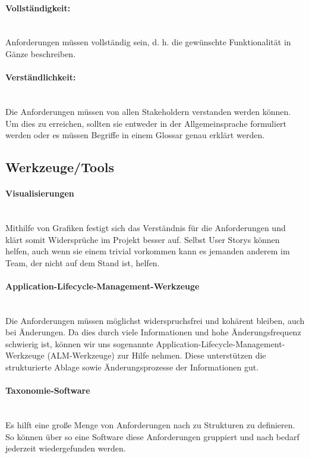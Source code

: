 \documentclass[a4paper, ngerman, 12pt, usenames, dvipsnames]{article}
\begin{document}
\paragraph{Vollständigkeit:}\mbox{} \\
Anforderungen müssen vollständig sein, d. h. die gewünschte Funktionalität in Gänze beschreiben.
\paragraph{Verständlichkeit:}\mbox{} \\
Die Anforderungen müssen von allen Stakeholdern verstanden werden können. 
Um dies zu erreichen, sollten sie entweder in der Allgemeinsprache formuliert werden oder es müssen Begriffe in einem Glossar genau erklärt werden.


\subsection{Werkzeuge/Tools}

\paragraph{Visualisierungen}\mbox{} \\
Mithilfe von Grafiken festigt sich das Verständnis für die Anforderungen und klärt somit Widersprüche im Projekt besser auf. Selbst User Storys können helfen, auch wenn sie einem trivial vorkommen kann es jemanden anderem im Team, der nicht auf dem Stand ist, helfen.
\paragraph{Application-Lifecycle-Management-Werkzeuge}\mbox{} \\
Die Anforderungen müssen möglichst widerspruchsfrei und kohärent bleiben, auch bei Änderungen. Da dies durch viele Informationen und hohe Änderungsfrequenz schwierig ist, können wir uns sogenannte Application-Lifecycle-Management-Werkzeuge (ALM-Werkzeuge) zur Hilfe nehmen. Diese unterstützen die strukturierte Ablage sowie Änderungsprozesse der Informationen gut.\
\paragraph{Taxonomie-Software}\mbox{} \\
Es hilft eine große Menge von Anforderungen nach zu Strukturen zu definieren. So können über so eine Software diese Anforderungen gruppiert und nach bedarf jederzeit wiedergefunden werden.
\end{document}
